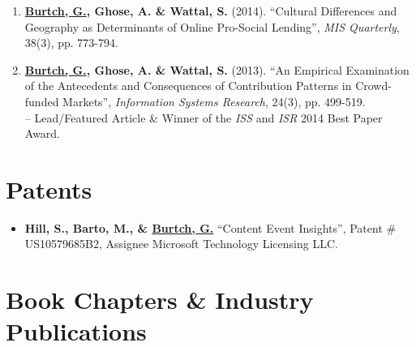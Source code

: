 \documentclass[10.5pt,letterpaper,sans]{moderncv}        %
\begin{document}
\begin{enumerate}[leftmargin=!,labelindent=5pt,itemindent=-15pt]
\item \textbf{\underline{Burtch, G.}, Ghose, A. \& Wattal, S.} (2014). ``Cultural Differences and Geography as Determinants of Online Pro-Social Lending'', \textit{MIS Quarterly}, 38(3), pp. 773-794.

\item \textbf{\underline{Burtch, G.}, Ghose, A. \& Wattal, S.} (2013). ``An Empirical Examination of the Antecedents and Consequences of Contribution Patterns in Crowd-funded Markets'', \textit{Information Systems Research}, 24(3), pp. 499-519. \\-- Lead/Featured Article \& Winner of the \textit{ISS} and \textit{ISR} 2014 Best Paper Award.

\end{enumerate}

\section{Patents}

\begin{itemize}[leftmargin=!,labelindent=5pt,itemindent=-15pt]

\item \textbf{Hill, S., Barto, M., \& \underline{Burtch, G.}} ``Content Event Insights'', Patent \# US10579685B2, Assignee\: Microsoft Technology Licensing LLC.

\end{itemize}

\vspace{4 pt}

\section{Book Chapters \& Industry Publications}

\smallskip
\end{document}

